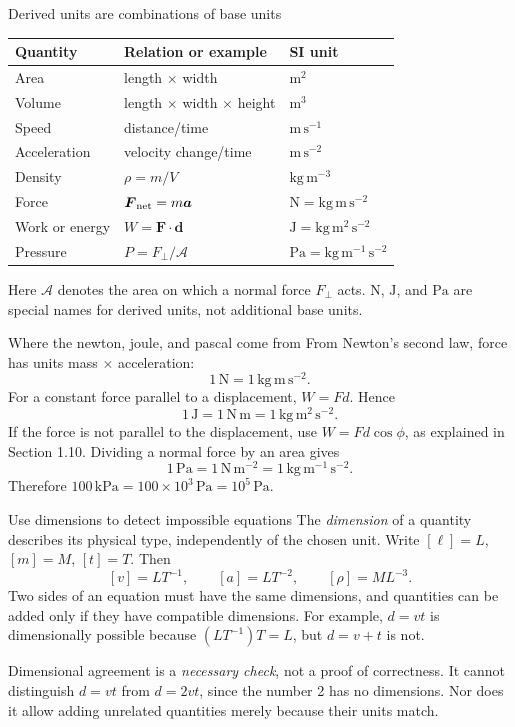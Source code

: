 \documentclass[11pt,letterpaper]{article}
\newcommand{\vect}[1]{\boldsymbol{#1}}
\newcommand{\unit}[1]{\,\mathrm{#1}}
\begin{document}
\begin{defbox}{Derived units are combinations of base units}
\begin{center}
\begin{tabular}{lll}
\toprule
Quantity & Relation or example & SI unit\\
\midrule
Area & length $\times$ width & $\mathrm{m^2}$\\
Volume & length $\times$ width $\times$ height & $\mathrm{m^3}$\\
Speed & distance/time & $\mathrm{m\,s^{-1}}$\\
Acceleration & velocity change/time & $\mathrm{m\,s^{-2}}$\\
Density & $\rho=m/V$ & $\mathrm{kg\,m^{-3}}$\\
Force & $\vect F_{\rm net}=m\vect a$ & $\mathrm{N=kg\,m\,s^{-2}}$\\
Work or energy & $W=\vect F\cdot\vect d$ & $\mathrm{J=kg\,m^2\,s^{-2}}$\\
Pressure & $P=F_\perp/\mathcal A$ & $\mathrm{Pa=kg\,m^{-1}\,s^{-2}}$\\
\bottomrule
\end{tabular}
\end{center}
Here $\mathcal A$ denotes the area on which a normal force $F_\perp$ acts. $\mathrm{N}$, $\mathrm{J}$, and $\mathrm{Pa}$ are special names for derived units, not additional base units.
\end{defbox}

\begin{derivbox}{Where the newton, joule, and pascal come from}
From Newton's second law, force has units mass $\times$ acceleration:
\[
 \boxed{1\unit{N}=1\unit{kg\,m\,s^{-2}}.}
\]
For a constant force parallel to a displacement, $W=Fd$. Hence
\[
 \boxed{1\unit{J}=1\unit{N\,m}=1\unit{kg\,m^2\,s^{-2}}.}
\]
If the force is not parallel to the displacement, use $W=Fd\cos\phi$, as explained in Section 1.10. Dividing a normal force by an area gives
\[
 \boxed{1\unit{Pa}=1\unit{N\,m^{-2}}=1\unit{kg\,m^{-1}\,s^{-2}}.}
\]
Therefore $100\unit{kPa}=100\times10^3\unit{Pa}=10^5\unit{Pa}$.
\end{derivbox}

\begin{rulebox}{Use dimensions to detect impossible equations}
The \emph{dimension} of a quantity describes its physical type, independently of the chosen unit. Write $[\ell]=L$, $[m]=M$, $[t]=T$. Then
\[
 [v]=LT^{-1},\qquad [a]=LT^{-2},\qquad [\rho]=ML^{-3}.
\]
Two sides of an equation must have the same dimensions, and quantities can be added only if they have compatible dimensions. For example, $d=vt$ is dimensionally possible because $(LT^{-1})T=L$, but $d=v+t$ is not.

Dimensional agreement is a \emph{necessary check}, not a proof of correctness. It cannot distinguish $d=vt$ from $d=2vt$, since the number 2 has no dimensions. Nor does it allow adding unrelated quantities merely because their units match.
\end{rulebox}
\end{document}
